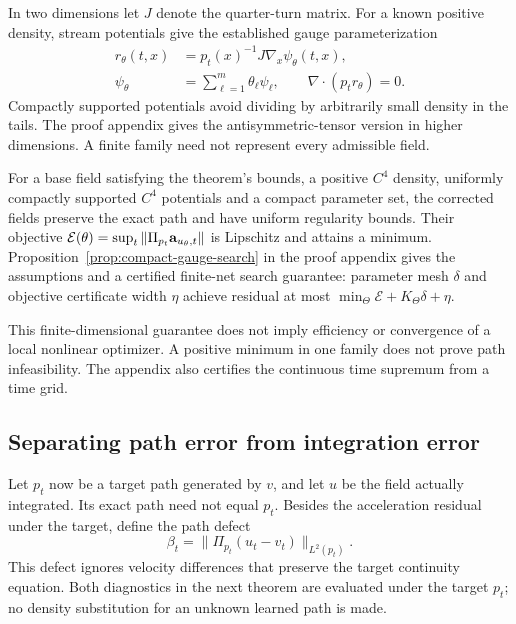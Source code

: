 In two dimensions let $J$ denote the quarter-turn matrix.  For a known
positive density, stream potentials give the established gauge
parameterization~\citep{horvat2024gauge}
\begin{align}
 r_\theta(t,x)&=p_t(x)^{-1}J\nabla_x\psi_\theta(t,x),\nonumber\\
 \psi_\theta&=\sum_{\ell=1}^m\theta_\ell\psi_\ell,
 \qquad \nabla\cdot(p_tr_\theta)=0.
 \label{eq:compact-stream-gauge}
\end{align}
Compactly supported potentials avoid dividing by arbitrarily small density
in the tails.  The proof appendix gives the antisymmetric-tensor version in higher
dimensions. A finite family need not represent every admissible field.

For a base field satisfying the theorem's bounds, a positive $C^4$ density,
uniformly compactly supported $C^4$ potentials and a compact parameter set,
the corrected fields preserve the
exact path and have uniform regularity bounds.  Their objective
$\mathcal E(\theta)=\sup_t\|\Pi_{p_t}\mathbf a_{u_\theta,t}\|$ is
Lipschitz and attains a minimum.  Proposition~\ref{prop:compact-gauge-search}
in the proof appendix gives the assumptions and a certified finite-net
search guarantee: parameter mesh $\delta$ and objective certificate width
$\eta$ achieve residual at most
$\min_\Theta\mathcal E+K_\Theta\delta+\eta$.


This finite-dimensional guarantee does not imply efficiency or convergence
of a local nonlinear optimizer.  A positive minimum in one family does
not prove path infeasibility.  The appendix also certifies the continuous
time supremum from a time grid.

\subsection{Separating path error from integration error}

Let $p_t$ now be a target path generated by $v$, and let $u$ be the field
actually integrated.  Its exact path need not equal $p_t$.  Besides the
acceleration residual under the target, define the path defect
\begin{equation}
 \beta_t=\|\Pi_{p_t}(u_t-v_t)\|_{L^2(p_t)}.
 \label{eq:path-defect}
\end{equation}
This defect ignores velocity differences that preserve the target
continuity equation.  Both diagnostics in the next theorem are evaluated under the target
$p_t$; no density substitution for an unknown learned path is made.

